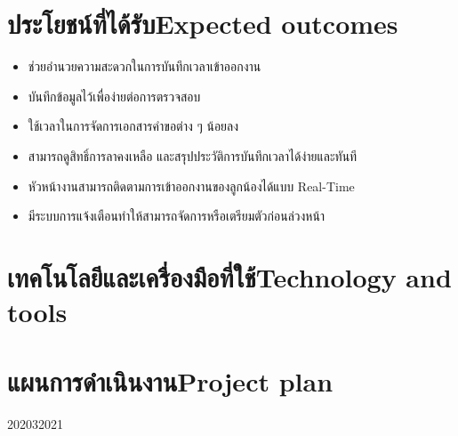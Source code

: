 \section{\ifcpe ประโยชน์ที่ได้รับ\else Expected outcomes\fi}
\begin{itemize}
    \item ช่วยอำนวยความสะดวกในการบันทึกเวลาเข้าออกงาน
    \item บันทึกข้อมูลไว้เพื่อง่ายต่อการตรวจสอบ
    \item ใช้เวลาในการจัดการเอกสารคำขอต่าง ๆ น้อยลง
    \item สามารถดูสิทธิ์การลาคงเหลือ และสรุปประวัติการบันทึกเวลาได้ง่ายและทันที
    \item หัวหน้างานสามารถติดตามการเข้าออกงานของลูกน้องได้แบบ Real-Time
    \item มีระบบการแจ้งเตือนทำให้สามารถจัดการหรือเตรียมตัวก่อนล่วงหน้า
\end{itemize}
\section{\ifcpe เทคโนโลยีและเครื่องมือที่ใช้\else Technology and tools\fi}
\section{\ifcpe แผนการดำเนินงาน\else Project plan\fi}
\begin{plan}{7}{2020}{3}{2021}
\end{plan}

